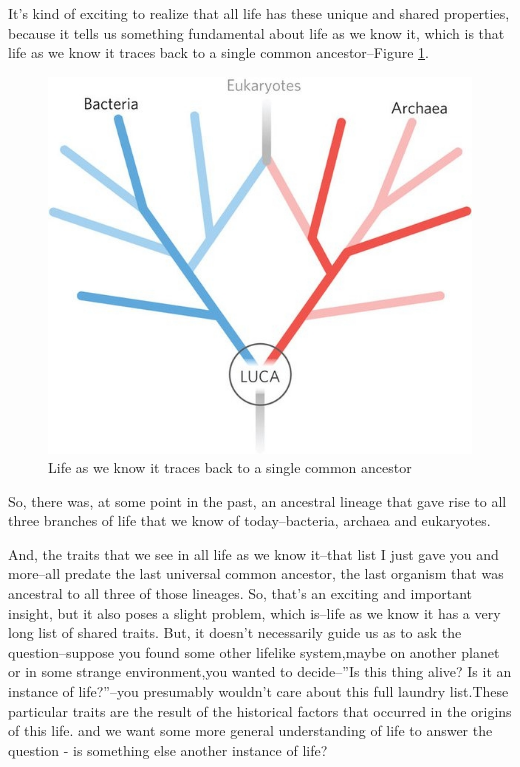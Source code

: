 \documentclass[]{article}
\begin{document}
It's kind of exciting to realize that all life has these unique
and shared properties, because it tells us something fundamental about life as we know it, which is that life as we know it traces back to a single common ancestor--Figure \ref{fig:LUCA_common}.
\begin{figure}[H]
	\caption{Life as we know it traces back to a single common ancestor}\label{fig:LUCA_common} 
	\includegraphics[width=\textwidth]{LUCA_common}
\end{figure}
So, there was, at some point in the past, an ancestral lineage that gave rise to
all three branches of life that we know of today--bacteria, archaea and eukaryotes.

And, the traits that we see in all life as we know it--that list I just gave you and more--all predate the last universal common ancestor, the last organism that was ancestral to all three of those lineages.
So, that's an exciting and important insight, but it also poses a slight problem, which is--life as we know it has a very long list of shared traits.
But, it doesn't necessarily guide us as to ask the question--suppose you found some other lifelike system,maybe on another planet or in some strange environment,you wanted to decide--''Is this thing alive? Is it an instance of life?''--you presumably wouldn't care about this full laundry list.These particular traits are the result of the historical factors that occurred in the origins of this life. and we want some more general understanding of life to answer the question - is something else another instance of life?
\end{document}
